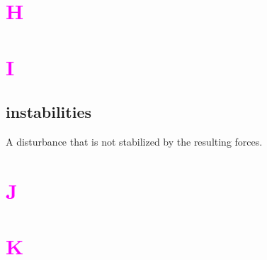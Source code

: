 \documentclass[12pt]{article}
\begin{document}
\section*{\textcolor{magenta}{H}}

\section*{\textcolor{magenta}{I}}
\subsection*{instabilities}
A disturbance that is not stabilized by the resulting forces.

\section*{\textcolor{magenta}{J}}
\section*{\textcolor{magenta}{K}}
\end{document}
